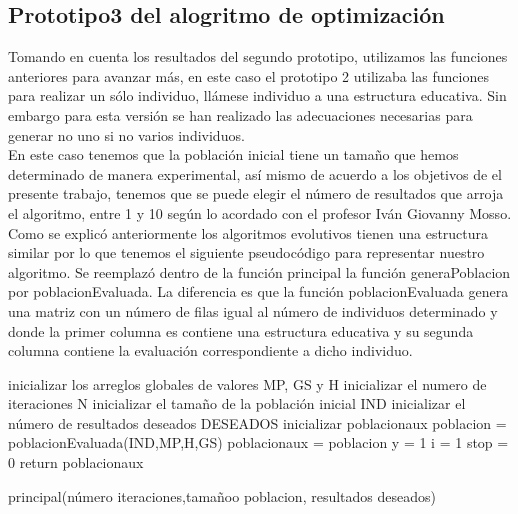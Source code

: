\subsection{Prototipo3 del alogritmo de optimización}

Tomando en cuenta los resultados del segundo prototipo, utilizamos las funciones anteriores para avanzar más, en este caso el prototipo 2 utilizaba las funciones para realizar un sólo individuo, llámese individuo a una estructura educativa. Sin embargo para esta versión se han realizado las adecuaciones necesarias para generar no uno si no varios individuos.\\

En este caso tenemos que la población inicial tiene un tamaño que hemos determinado de manera experimental, así mismo de acuerdo a los objetivos de el presente trabajo, tenemos que se puede elegir el número de resultados que arroja el algoritmo, entre 1 y 10 según lo acordado con el profesor Iván Giovanny Mosso.\\

Como se explicó anteriormente los algoritmos evolutivos tienen una estructura similar por lo que tenemos el siguiente pseudocódigo para representar nuestro algoritmo. Se reemplazó dentro de la función principal la función generaPoblacion por poblacionEvaluada. La diferencia es que la función poblacionEvaluada genera una matriz con un número de filas igual al número de individuos determinado y donde la primer columna es contiene una estructura educativa y su segunda columna contiene la evaluación correspondiente a dicho individuo.\\

\begin{algorithm}[H]
	\DontPrintSemicolon
	\SetAlgoLined
	inicializar los arreglos globales de valores MP, GS y H\;
	inicializar el numero de iteraciones N\;
	inicializar el tamaño de la población inicial IND\;
	inicializar el número de resultados deseados DESEADOS\;
	inicializar poblacionaux\;
	poblacion = poblacionEvaluada(IND,MP,H,GS)\;
	poblacionaux = poblacion\;
	y = 1\;
	i = 1\;
	stop = 0\;
	return poblacionaux\;
	\caption{principal(número iteraciones,tamañoo poblacion, resultados deseados)}
\end{algorithm}

